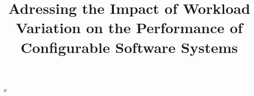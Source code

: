 \documentclass[10pt,conference]{IEEEtran}
\begin{document}
	
	\title{Adressing the Impact of Workload Variation on the Performance of Configurable Software Systems}
	\author{}
	
	\maketitle
	
	s
	\maketitle
	\setcounter{tocdepth}{4}
	
	
	\clearpage
	
	
\end{document}
